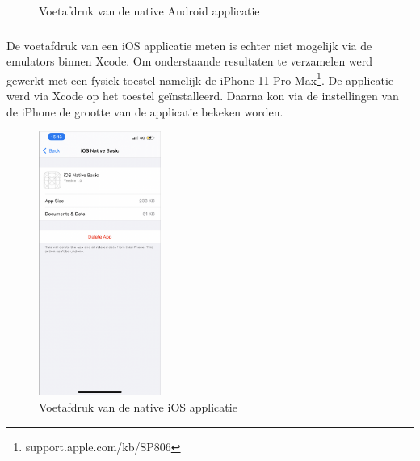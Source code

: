 \begin{figure}
    
    \caption{Voetafdruk van de native Android applicatie}
    \label{fig:M-voetafdruk-android}
\end{figure}


\subsubsection{}
\label{sec:M-test-voetafdruk-ios}
De voetafdruk van een iOS applicatie meten is echter niet mogelijk via de emulators binnen Xcode. Om onderstaande resultaten te verzamelen werd gewerkt met een fysiek toestel namelijk de iPhone 11 Pro Max\footnote{support.apple.com/kb/SP806}. De applicatie werd via Xcode op het toestel geïnstalleerd. Daarna kon via de instellingen van de iPhone de grootte van de applicatie bekeken worden.

\begin{figure}
    \centering
    \includegraphics[width=4cm]{img/voetafdruk-i-native}
    \caption{Voetafdruk van de native iOS applicatie}
    \label{fig:M-voetafdruk-ios}
\end{figure}


